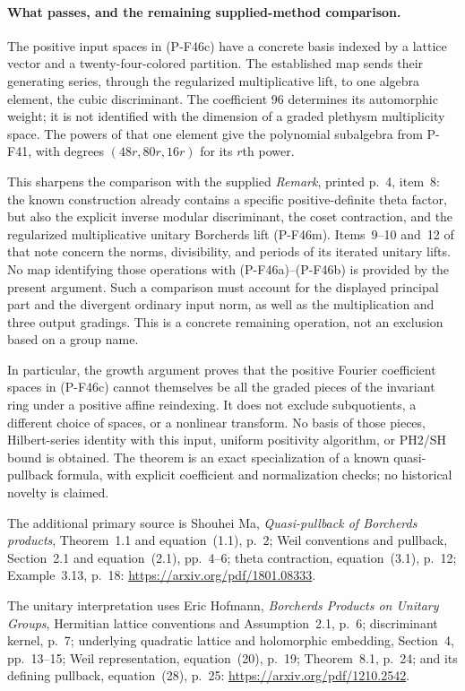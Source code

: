\paragraph{What passes, and the remaining supplied-method comparison.}
The positive input spaces in (P-F46c) have a concrete
basis indexed by a lattice vector and a twenty-four-colored
partition. The established map sends their generating
series, through the regularized multiplicative lift,
to one algebra element, the cubic discriminant. The
coefficient $96$ determines its automorphic weight;
it is not identified with the dimension of a graded
plethysm multiplicity space. The powers of that one
element give the polynomial subalgebra from P-F41,
with degrees $(48r,80r,16r)$ for its $r$th power.

This sharpens the comparison with the supplied
\emph{Remark}, printed p.~4, item~8: the known
construction already contains a specific positive-definite
theta factor, but also the explicit inverse modular
discriminant, the coset contraction, and the regularized
multiplicative unitary Borcherds lift (P-F46m). Items~9--10 and~12 of that note
concern the norms, divisibility, and periods of its
iterated unitary lifts. No map identifying those
operations with (P-F46a)--(P-F46b) is provided by the
present argument. Such a comparison must account for
the displayed principal part and the divergent ordinary
input norm, as well as the multiplication and three
output gradings. This is a concrete remaining operation,
not an exclusion based on a group name.

In particular, the growth argument proves that the
positive Fourier coefficient spaces in (P-F46c) cannot
themselves be all the graded pieces of the invariant
ring under a positive affine reindexing. It does not
exclude subquotients, a different choice of spaces,
or a nonlinear transform. No basis
of those pieces, Hilbert-series identity with this
input, uniform positivity algorithm, or PH2/SH bound
is obtained. The theorem is an exact specialization of
a known quasi-pullback formula, with explicit coefficient
and normalization checks; no historical novelty is claimed.

The additional primary source is Shouhei Ma,
\emph{Quasi-pullback of Borcherds products},
Theorem~1.1 and equation~(1.1), p.~2; Weil conventions
and pullback, Section~2.1 and equation~(2.1), pp.~4--6;
theta contraction, equation~(3.1), p.~12; Example~3.13,
p.~18:
\url{https://arxiv.org/pdf/1801.08333}.

The unitary interpretation uses Eric Hofmann,
\emph{Borcherds Products on Unitary Groups},
Hermitian lattice conventions and Assumption~2.1, p.~6;
discriminant kernel, p.~7; underlying quadratic lattice
and holomorphic embedding, Section~4, pp.~13--15;
Weil representation, equation~(20), p.~19;
Theorem~8.1, p.~24; and its defining pullback,
equation~(28), p.~25:
\url{https://arxiv.org/pdf/1210.2542}.
